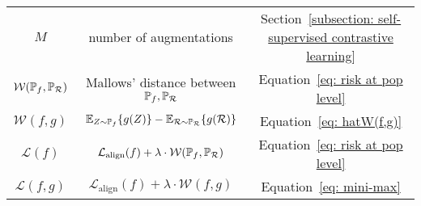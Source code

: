 \begin{longtable}{@{}ccc@{}}
    $M$             & number of augmentations &  Section~\ref{subsection: self-supervised contrastive learning} \\
    $\mathcal{W}(\P_f, \P_\mathcal{R})$  & Mallows' distance between $\P_f,\P_\mathcal{R}$ & Equation~\eqref{eq: risk at pop level}         \\
    $\mathcal{W}(f,g)$ & $\E_{Z\sim \P_f}\{g(Z)\} - \E_{\mathcal{R}\sim \P_\mathcal{R}} \{g(\mathcal{R})\}$ & Equation~\eqref{eq: hatW(f,g)}        \\
    $\mathcal{L}(f)$ & $\mathcal{L}_{\mathrm{align}}(f) + \lambda\cdot\mathcal{W}(\P_f, \P_\mathcal{R})$ &    Equation~\eqref{eq: risk at pop level}      \\
    $\mathcal{L}(f,g)$ & $\mathcal{L}_{\mathrm{align}}(f) + \lambda\cdot\mathcal{W}(f, g)$ &         Equation~\eqref{eq: mini-max} \\
\end{longtable}

